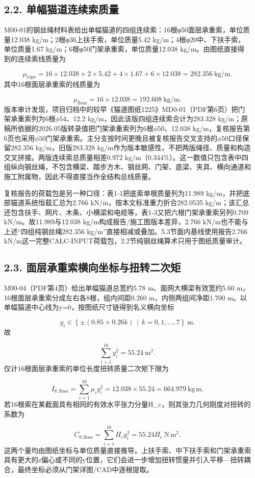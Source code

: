 \documentclass[UTF8,a4paper,11pt,fontset=none]{ctexart}
\begin{document}
\subsection*{2.2. 单幅猫道连续索质量}
M00-01的钢丝绳材料表给出单幅猫道的四组连续索：16根φ50面层承重索，单位质量12.038 kg/m；2根φ36上扶手索，单位质量5.42 kg/m；4根φ20中、下扶手索，单位质量1.67 kg/m；6根φ50门架承重索，单位质量12.038 kg/m。由图纸直接得到的连续索线质量为\par
\[
\mu_{\mathrm{rope}}
=16\times 12.038+2\times 5.42+4\times 1.67+6\times 12.038
=282.356\ \mathrm{kg/m}.
\]
其中16根面层承重索的线质量为\par
\[
\mu_{\mathrm{floor}}=16\times 12.038=192.608\ \mathrm{kg/m}.
\]
版本审计发现，项目归档中的较早《猫道图纸1225》MD0-01（PDF第6页）把门架承重索列为6根\(\phi54\)\allowbreak{}、12.2 kg/m，因此该版四组连续索合计为283.328 kg/m；原稿所依据的2026.05版转录值把门架承重索列为6根\(\phi50\)\allowbreak{}、12.038 kg/m，复核报告第6页也采用\(\phi50\)\allowbreak{}门架承重索。主分支按时间更晚且被复核报告交叉支持的\(\phi50\)\allowbreak{}口径保留282.356 kg/m，旧版283.328 kg/m作为版本敏感性，不把两版绳径、质量和构造交叉拼接。两版连续索总质量相差0.972 kg/m（0.344\%）。这一数值只包含表中四组纵向钢丝绳，不包含横梁、踏步方木、钢丝网、门架、底梁、夹具、横向通道和施工附属物，因此不得直接当作全结构总线质量。\par
复核报告的荷载包是另一种口径：表1-1把底索单根质量列为11.989 kg/m，并把底部猫道系统恒载汇总为2.766 kN/m，按本文标准重力折合282.0535 kg/m；该汇总还包含扶手、网片、木条、小横梁和电缆等，表1-3又把六根门架承重索另列0.709 kN/m。故11.989与12.038 kg/m构成报告/施工图版本差异，2.766 kN/m也不能与上述“四组纯钢丝绳282.356 kg/m”直接相减或叠加。5.3节面内基线使用报告2.766 kN/m这一完整CALC-INPUT荷载包，2.2节纯钢丝绳算术只用于图纸质量审计。\par
{}
\subsection*{2.3. 面层承重索横向坐标与扭转二次矩}
M00-04（PDF第4页）给出单幅猫道总宽约5.78 m、面网大横梁有效宽约5.60 m，16根面层承重索分成左右各8根，组内间距0.260 m，内侧两组间净距1.700 m。以单幅猫道中心线为y=0，按图纸尺寸链得到名义横向坐标\par
\[
y_i\in\left\{\pm\left(0.85+0.26k\right)\,\middle|\,k=0,1,\ldots,7\right\}\ \mathrm{m}.
\]
故\par
\[
\sum_{i=1}^{16}y_i^2=55.24\ \mathrm{m^2}.
\]
仅计16根面层承重索的单位长度扭转质量二次矩下限为\par
\[
I_{\theta,\mathrm{floor}}
=\sum_{i=1}^{16}\mu_i y_i^2
=12.038\times55.24
=664.979\ \mathrm{kg\,m}.
\]
若16根索在某截面具有相同的有效水平张力分量H\_c，则其张力几何刚度对扭转的系数为\par
\[
C_{\theta,\mathrm{floor}}
=\sum_{i=1}^{16}H_c y_i^2
=55.24H_c\ \mathrm{N\,m^2}.
\]
这两个量均由图纸坐标与单位质量直接推导。上扶手索、中下扶手索和门架承重索具有更大的z偏心或不同的y位置，它们会进一步增加扭转惯量并引入平移—扭转耦合，最终坐标必须从门架详图/CAD中逐根提取。\par
{}
\end{document}
